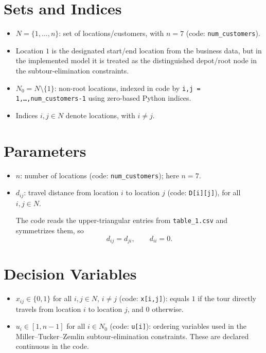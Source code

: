 \section*{Sets and Indices}

\begin{itemize}
    \item $N = \{1,\dots,n\}$: set of locations/customers, with $n=7$ (code: \texttt{num\_customers}).
    \item Location $1$ is the designated start/end location from the business data, but in the implemented model it is treated as the distinguished depot/root node in the subtour-elimination constraints.
    \item $N_0 = N \setminus \{1\}$: non-root locations, indexed in code by \texttt{i,j = 1,\dots,num\_customers-1} using zero-based Python indices.
    \item Indices $i,j \in N$ denote locations, with $i \neq j$.
\end{itemize}

\section*{Parameters}

\begin{itemize}
    \item $n$: number of locations (code: \texttt{num\_customers}); here $n=7$.
    \item $d_{ij}$: travel distance from location $i$ to location $j$ (code: \texttt{D[i][j]}), for all $i,j \in N$.
    
    The code reads the upper-triangular entries from \texttt{table\_1.csv} and symmetrizes them, so
    \[
    d_{ij} = d_{ji}, \qquad d_{ii}=0.
    \]
\end{itemize}

\section*{Decision Variables}

\begin{itemize}
    \item $x_{ij} \in \{0,1\}$ for all $i,j \in N$, $i \neq j$ (code: \texttt{x[i,j]}): equals $1$ if the tour directly travels from location $i$ to location $j$, and $0$ otherwise.
    \item $u_i \in [1,n-1]$ for all $i \in N_0$ (code: \texttt{u[i]}): ordering variables used in the Miller--Tucker--Zemlin subtour-elimination constraints. These are declared continuous in the code.
\end{itemize}

